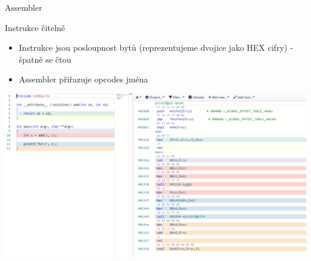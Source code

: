\documentclass[9pt]{beamer}
\begin{document}
\begin{frame}{Assembler}
    \begin{block}{Instrukce čitelně}
        \begin{itemize}
            \item Instrukce jsou posloupnost bytů (reprezentujeme dvojice jako HEX cifry) - špatně se čtou
            \item Assembler přiřazuje opcodes jména
        \end{itemize}
    \end{block}

    \begin{center}
        \includegraphics[width=0.9\linewidth]{lekce19/assembler.png}
    \end{center}
    
\end{frame}
\end{document}
